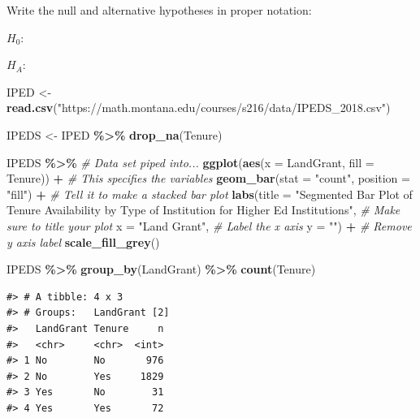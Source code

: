 \documentclass[
]{report}
\newenvironment{Shaded}{\begin{snugshade}}{\end{snugshade}}
\newcommand{\AttributeTok}[1]{\textcolor[rgb]{0.13,0.29,0.53}{#1}}
\newcommand{\CommentTok}[1]{\textcolor[rgb]{0.56,0.35,0.01}{\textit{#1}}}
\newcommand{\FunctionTok}[1]{\textcolor[rgb]{0.13,0.29,0.53}{\textbf{#1}}}
\newcommand{\NormalTok}[1]{#1}
\newcommand{\OtherTok}[1]{\textcolor[rgb]{0.56,0.35,0.01}{#1}}
\newcommand{\SpecialCharTok}[1]{\textcolor[rgb]{0.81,0.36,0.00}{\textbf{#1}}}
\newcommand{\StringTok}[1]{\textcolor[rgb]{0.31,0.60,0.02}{#1}}
\begin{document}
Write the null and alternative hypotheses in proper notation:

\(H_0:\)

\vspace{0.2in}

\(H_A:\)

\vspace{0.2in}

\begin{Shaded}
\begin{Highlighting}[]
\NormalTok{IPED }\OtherTok{\textless{}{-}}\FunctionTok{read.csv}\NormalTok{(}\StringTok{"https://math.montana.edu/courses/s216/data/IPEDS\_2018.csv"}\NormalTok{)}

\NormalTok{IPEDS }\OtherTok{\textless{}{-}}\NormalTok{ IPED }\SpecialCharTok{\%\textgreater{}\%}
    \FunctionTok{drop\_na}\NormalTok{(Tenure)}

\NormalTok{IPEDS }\SpecialCharTok{\%\textgreater{}\%} \CommentTok{\# Data set piped into...}
    \FunctionTok{ggplot}\NormalTok{(}\FunctionTok{aes}\NormalTok{(}\AttributeTok{x =}\NormalTok{ LandGrant, }\AttributeTok{fill =}\NormalTok{ Tenure)) }\SpecialCharTok{+}   \CommentTok{\# This specifies the variables}
  \FunctionTok{geom\_bar}\NormalTok{(}\AttributeTok{stat =} \StringTok{"count"}\NormalTok{, }\AttributeTok{position =} \StringTok{"fill"}\NormalTok{) }\SpecialCharTok{+}  \CommentTok{\# Tell it to make a stacked bar plot}
  \FunctionTok{labs}\NormalTok{(}\AttributeTok{title =} \StringTok{"Segmented Bar Plot of Tenure Availability }
\StringTok{       by Type of Institution for Higher Ed Institutions"}\NormalTok{,  }
       \CommentTok{\# Make sure to title your plot }
       \AttributeTok{x =} \StringTok{"Land Grant"}\NormalTok{,   }\CommentTok{\# Label the x axis}
       \AttributeTok{y =} \StringTok{""}\NormalTok{) }\SpecialCharTok{+} \CommentTok{\# Remove y axis label }
    \FunctionTok{scale\_fill\_grey}\NormalTok{()}

\NormalTok{IPEDS }\SpecialCharTok{\%\textgreater{}\%} \FunctionTok{group\_by}\NormalTok{(LandGrant) }\SpecialCharTok{\%\textgreater{}\%} \FunctionTok{count}\NormalTok{(Tenure)}
\end{Highlighting}
\end{Shaded}

\begin{verbatim}
#> # A tibble: 4 x 3
#> # Groups:   LandGrant [2]
#>   LandGrant Tenure     n
#>   <chr>     <chr>  <int>
#> 1 No        No       976
#> 2 No        Yes     1829
#> 3 Yes       No        31
#> 4 Yes       Yes       72
\end{verbatim}
\end{document}
